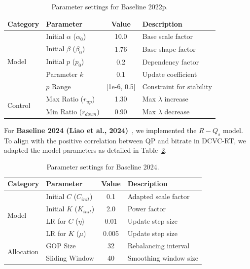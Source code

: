 \begin{table}[ht]
\centering
\caption{Parameter settings for Baseline 2022p.}
\label{tab:params_2022}
\begin{tabular}{@{}llcl@{}}
\toprule
\textbf{Category} & \textbf{Parameter} & \textbf{Value} & \textbf{Description} \\ \midrule
\multirow{5}{*}{Model} 
 & Initial $\alpha$ ($\alpha_0$) & 10.0 & Base scale factor \\
 & Initial $\beta$ ($\beta_0$) & 1.76 & Base shape factor \\
 & Initial $p$ ($p_0$) & 0.2 & Dependency factor \\
 & Parameter $k$ & 0.1 & Update coefficient \\
 & $p$ Range & [1e-6, 0.5] & Constraint for stability \\ \midrule
\multirow{2}{*}{Control} 
 & Max Ratio ($r_{up}$) & 1.30 & Max $\lambda$ increase \\
 & Min Ratio ($r_{down}$) & 0.90 & Max $\lambda$ decrease \\ \bottomrule
\end{tabular}
\end{table}

For \textbf{Baseline 2024 (Liao et al., 2024)}~\cite{52}, we implemented the $R-Q_s$ model. To align with the positive correlation between QP and bitrate in DCVC-RT, we adapted the model parameters as detailed in Table~\ref{tab:params_2024}.

\begin{table}[ht]
\centering
\caption{Parameter settings for Baseline 2024.}
\label{tab:params_2024}
\begin{tabular}{@{}llcl@{}}
\toprule
\textbf{Category} & \textbf{Parameter} & \textbf{Value} & \textbf{Description} \\ \midrule
\multirow{4}{*}{Model} 
 & Initial $C$ ($C_{init}$) & 0.1 & Adapted scale factor \\
 & Initial $K$ ($K_{init}$) & 2.0 & Power factor \\
 & LR for $C$ ($\eta$) & 0.01 & Update step size \\
 & LR for $K$ ($\mu$) & 0.005 & Update step size \\ \midrule
\multirow{2}{*}{Allocation} 
 & GOP Size & 32 & Rebalancing interval \\
 & Sliding Window & 40 & Smoothing window size \\ \bottomrule
\end{tabular}
\end{table}

